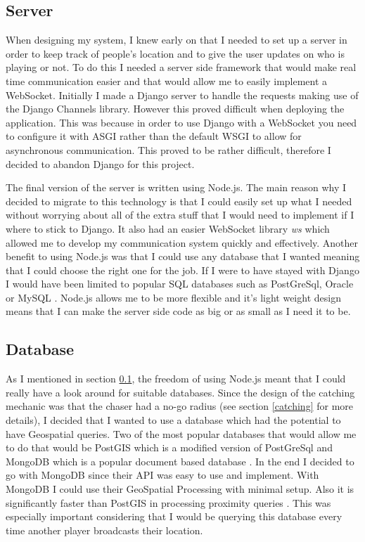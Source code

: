\documentclass{l4proj}
\begin{document}
\subsection{Server}
\label{implementationServer}
When designing my system, I knew early on that I needed to set up a server in order to keep track of people's location
and to give the user updates on who is playing or not. To do this I needed a server side framework that would make real
time communication easier and that would allow me to easily implement a WebSocket. Initially I made a Django server to
handle the requests making use of the Django Channels library. However this proved difficult when deploying the application.
This was because in order to use Django with a WebSocket you need to configure it with ASGI rather than the default WSGI
to allow for asynchronous communication. This proved to be rather difficult, therefore I decided to abandon Django for this
project.

The final version of the server is written using Node.js. The main reason why I decided to migrate to this technology is that
I could easily set up what I needed without worrying about all of the extra stuff that I would need to implement if I where to
stick to Django. It also had an easier WebSocket library \emph{ws} which allowed me to develop my communication system quickly
and effectively. Another benefit to using Node.js was that I could use any database that I wanted meaning that I could
choose the right one for the job. If I were to have stayed with Django I would have been limited to popular SQL databases
such as PostGreSql, Oracle or MySQL \citep{djangoDatabases}. Node.js allows me to be more flexible and it's light weight
design means that I can make the server side code as big or as small as I need it to be.

\subsection{Database}
As I mentioned in section \ref{implementationServer}, the freedom of using Node.js meant that I could really have a look
around for suitable databases. Since the design of the catching mechanic was that the chaser had a no-go radius (see section
\ref{catching} for more details), I decided that I wanted to use a database which had the potential to have Geospatial queries.
Two of the most popular databases that would allow me to do that would be PostGIS which is a modified version of PostGreSql \citep{postgis, postgres} and
MongoDB which is a popular document based database \citep{mongodb}. In the end I decided to go with MongoDB since their API
was easy to use and implement. With MongoDB I could use their GeoSpatial Processing with minimal setup. Also it is significantly
faster than PostGIS in processing proximity queries \citep{Bartoszewski2019}. This was especially important considering
that I would be querying this database every time another player broadcasts their location.
\end{document}
